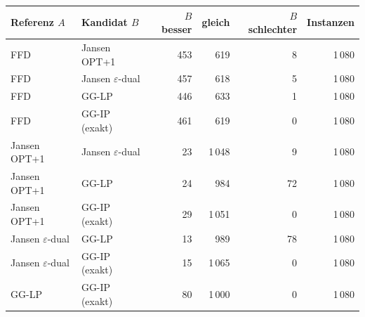 \begin{tabular}{llrrrr}
\toprule
Referenz $A$ & Kandidat $B$ & $B$ besser & gleich & $B$ schlechter & Instanzen \\
\midrule
FFD & Jansen OPT+1 & 453 & 619 & 8 & 1\,080 \\
FFD & Jansen $\varepsilon$-dual & 457 & 618 & 5 & 1\,080 \\
FFD & GG-LP & 446 & 633 & 1 & 1\,080 \\
FFD & GG-IP (exakt) & 461 & 619 & 0 & 1\,080 \\
Jansen OPT+1 & Jansen $\varepsilon$-dual & 23 & 1\,048 & 9 & 1\,080 \\
Jansen OPT+1 & GG-LP & 24 & 984 & 72 & 1\,080 \\
Jansen OPT+1 & GG-IP (exakt) & 29 & 1\,051 & 0 & 1\,080 \\
Jansen $\varepsilon$-dual & GG-LP & 13 & 989 & 78 & 1\,080 \\
Jansen $\varepsilon$-dual & GG-IP (exakt) & 15 & 1\,065 & 0 & 1\,080 \\
GG-LP & GG-IP (exakt) & 80 & 1\,000 & 0 & 1\,080 \\
\bottomrule
\end{tabular}

